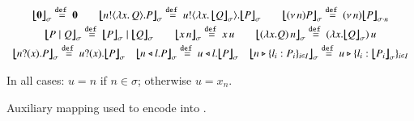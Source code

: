 \begin{figure}[t]
\[%
	\begin{array}{c}
		\auxmapp{\inact}{{}}{\sigma}  \defeq  \inact
		\qquad \auxmapp{\bout{n}{\abs{x}{Q}} P}{{}}{\sigma} \defeq \bout{u}{\abs{x}{\auxmapp{Q}{{}}{\sigma}}} \auxmapp{P}{{}}{\sigma}
		\qquad
		\auxmapp{\news{n} P}{{}}{\sigma} \defeq \news{n} \auxmapp{P}{{}}{{\sigma \cat n}}
		\\[1mm]

		\auxmapp{P \Par Q}{{}}{\sigma} \defeq \auxmapp{P}{{}}{\sigma} \Par \auxmapp{Q}{{}}{\sigma} 
		\qquad
		\auxmapp{\appl{x}{n}}{{}}{\sigma} \defeq \appl{x}{u}
		\qquad
		\auxmapp{\appl{(\lambda x.Q)}{n}}{{}}{\sigma}  \defeq \appl{(\lambda x.\auxmapp{Q}{{}}{\sigma})}{u}
		\\[1mm]
		\auxmapp{\binp{n}{x} P}{{}}{\sigma} \defeq \binp{u}{x} \auxmapp{P}{{}}{\sigma} 
		\quad
		\auxmapp{\bsel{n}{l} P}{{}}{\sigma} \defeq \bsel{u}{l} \auxmapp{P}{{}}{\sigma} 
		\quad
		\auxmapp{\bbra{n}{l_i:P_i}_{i \in I}}{{}}{\sigma} \defeq \bbra{u}{l_i:\auxmapp{P_i}{{}}{\sigma}}_{i \in I}
	\end{array}
\]
\begin{center}
	{In all cases: $u = n$ if $n\in \sigma$; otherwise $u = x_n$.}
\end{center}
\vspace{-3mm}
\caption{\label{f:auxmap} Auxiliary mapping used to encode \HOp into \HO.}
\vspace{-1mm}
\end{figure}


